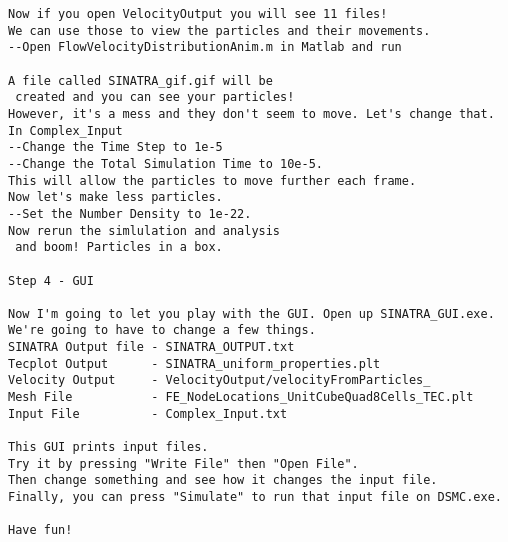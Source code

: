 \begin{verbatim}
Now if you open VelocityOutput you will see 11 files! 
We can use those to view the particles and their movements.
--Open FlowVelocityDistributionAnim.m in Matlab and run

A file called SINATRA_gif.gif will be
 created and you can see your particles!
However, it's a mess and they don't seem to move. Let's change that. 
In Complex_Input 
--Change the Time Step to 1e-5 
--Change the Total Simulation Time to 10e-5.
This will allow the particles to move further each frame. 
Now let's make less particles.
--Set the Number Density to 1e-22.
Now rerun the simlulation and analysis
 and boom! Particles in a box. 

Step 4 - GUI

Now I'm going to let you play with the GUI. Open up SINATRA_GUI.exe. 
We're going to have to change a few things. 
SINATRA Output file - SINATRA_OUTPUT.txt
Tecplot Output      - SINATRA_uniform_properties.plt
Velocity Output     - VelocityOutput/velocityFromParticles_
Mesh File           - FE_NodeLocations_UnitCubeQuad8Cells_TEC.plt
Input File          - Complex_Input.txt

This GUI prints input files. 
Try it by pressing "Write File" then "Open File". 
Then change something and see how it changes the input file. 
Finally, you can press "Simulate" to run that input file on DSMC.exe.

Have fun!


\end{verbatim}